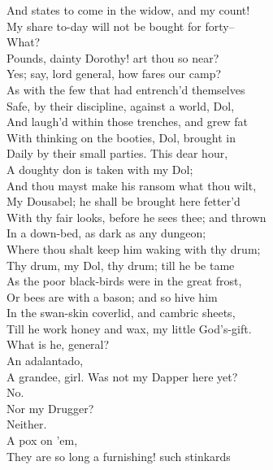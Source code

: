 \documentclass{memoir}
\begin{document}
\begin{drama*}
 And states to come in the widow, and my count!\\
 My share to-day will not be bought for forty--\\
\dolspeaks  What?\\
\facespeaks {} Pounds, dainty Dorothy! art thou so near?\\
\dolspeaks  Yes; say, lord general, how fares our camp?\\
\facespeaks  As with the few that had entrench'd themselves\\
 Safe, by their discipline, against a world, Dol,\\
 And laugh'd within those trenches, and grew fat\\
 With thinking on the booties, Dol, brought in\\
 Daily by their small parties. This dear hour,\\
 A doughty don is taken with my Dol;\\
 And thou mayst make his ransom what thou wilt,\\
 My Dousabel; he shall be brought here fetter'd\\
 With thy fair looks, before he sees thee; and thrown\\
 In a down-bed, as dark as any dungeon;\\
 Where thou shalt keep him waking with thy drum;\\
 Thy drum, my Dol, thy drum; till he be tame\\
 As the poor black-birds were in the great frost,\\
 Or bees are with a bason; and so hive him\\
 In the swan-skin coverlid, and cambric sheets,\\
 Till he work honey and wax, my little God's-gift.\\
\dolspeaks  What is he, general?\\
\facespeaks {} An adalantado,\\
 A grandee, girl. Was not my Dapper here yet?\\
\dolspeaks  No.\\
\facespeaks {} Nor my Drugger?\\
\dolspeaks {} Neither.\\
\facespeaks {} A pox on 'em,\\
 They are so long a furnishing! such stinkards\\

\end{drama*}
\end{document}
